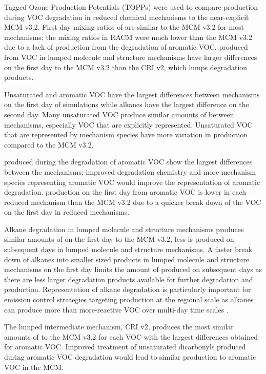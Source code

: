 Tagged Ozone Production Potentials (TOPPs) were used to compare  production during VOC degradation in reduced chemical mechanisms to the near-explicit MCM v3.2. 
First day mixing ratios of  are similar to the MCM v3.2 for most mechanisms; the  mixing ratios in RACM were much lower than the MCM v3.2 due to a lack of  production from the degradation of aromatic VOC.
 produced from VOC in lumped molecule and structure mechanisms have larger differences on the first day to the MCM v3.2 than the CRI v2, which lumps degradation products.

Unsaturated and aromatic VOC have the largest differences between mechanisms on the first day of simulations while alkanes have the largest difference on the second day.
Many unsaturated VOC produce similar amounts of  between mechanisms, especially VOC that are explicitly represented.
Unsaturated VOC that are represented by mechanism species have more variation in  production compared to the MCM v3.2.

 produced during the degradation of aromatic VOC show the largest differences between the mechanisms; improved degradation chemistry and more mechanism species representing aromatic VOC would improve the representation of aromatic degradation.
 production on the first day from aromatic VOC is lower in each reduced mechanism than the MCM v3.2 due to a quicker break down of the VOC on the first day in reduced mechanisms.

Alkane degradation in lumped molecule and structure mechanisms produces similar amounts of  on the first day to the MCM v3.2, less  is produced on subsequent days in lumped molecule and structure mechanisms.
A faster break down of alkanes into smaller sized products in lumped molecule and structure mechanisms on the first day limits the amount of  produced on subsequent days as there are less larger degradation products available for further degradation and  production.
Representation of alkane degradation is particularly important for emission control strategies targeting  production at the regional scale as alkanes can produce more  than more-reactive VOC over multi-day time scales \citep{Butler:2011}.

The lumped intermediate mechanism, CRI v2, produces the most similar amounts of  to the MCM v3.2 for each VOC with the largest differences obtained for aromatic VOC.
Improved treatment of unsaturated dicarbonyls produced during aromatic VOC degradation would lead to similar  production to aromatic VOC in the MCM.


